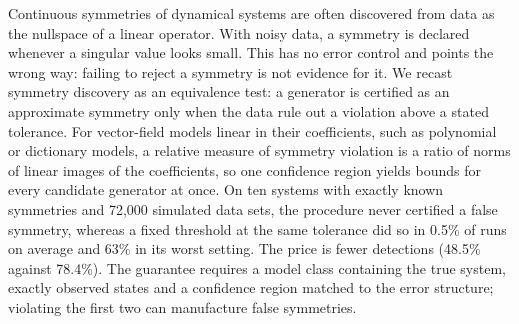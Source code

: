 Continuous symmetries of dynamical systems are often discovered from data as
the nullspace of a linear operator. With noisy data, a symmetry is declared
whenever a singular value looks small. This has no error control and points
the wrong way: failing to reject a symmetry is not evidence for it. We recast
symmetry discovery as an equivalence test: a generator is certified as an
approximate symmetry only when the data rule out a violation above a stated
tolerance. For vector-field models linear in their coefficients, such as
polynomial or dictionary models, a relative measure of symmetry violation is a
ratio of norms of linear images of the coefficients, so one confidence region
yields bounds for every candidate generator at once. On ten systems with
exactly known symmetries and 72,000 simulated data sets, the procedure never
certified a false symmetry, whereas a fixed threshold at the same tolerance did
so in 0.5\% of runs on average and 63\% in its worst setting. The price is
fewer detections (48.5\% against 78.4\%). The guarantee requires a model class
containing the true system, exactly observed states and a confidence region
matched to the error structure; violating the first two can manufacture false
symmetries.

